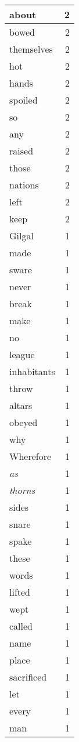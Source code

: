 \begin{center}
\begin{longtable}{l|r}
about & 2 \\ \hline
bowed & 2 \\ \hline
themselves & 2 \\ \hline
hot & 2 \\ \hline
hands & 2 \\ \hline
spoiled & 2 \\ \hline
so & 2 \\ \hline
any & 2 \\ \hline
raised & 2 \\ \hline
those & 2 \\ \hline
nations & 2 \\ \hline
left & 2 \\ \hline
keep & 2 \\ \hline
Gilgal & 1 \\ \hline
made & 1 \\ \hline
sware & 1 \\ \hline
never & 1 \\ \hline
break & 1 \\ \hline
make & 1 \\ \hline
no & 1 \\ \hline
league & 1 \\ \hline
inhabitants & 1 \\ \hline
throw & 1 \\ \hline
altars & 1 \\ \hline
obeyed & 1 \\ \hline
why & 1 \\ \hline
Wherefore & 1 \\ \hline
\emph{as} & 1 \\ \hline
\emph{thorns} & 1 \\ \hline
sides & 1 \\ \hline
snare & 1 \\ \hline
spake & 1 \\ \hline
these & 1 \\ \hline
words & 1 \\ \hline
lifted & 1 \\ \hline
wept & 1 \\ \hline
called & 1 \\ \hline
name & 1 \\ \hline
place & 1 \\ \hline
sacrificed & 1 \\ \hline
let & 1 \\ \hline
every & 1 \\ \hline
man & 1 \\ \hline

\end{longtable}
\end{center}
